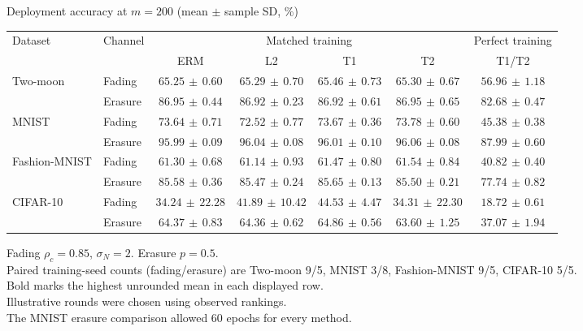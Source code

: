 \documentclass[border=4pt]{standalone}
\begin{document}
\begin{minipage}{7.8in}
\centering
Deployment accuracy at $m=200$ (mean $\pm$ sample SD, \%)\\[4pt]
\begin{tabular*}{\linewidth}{@{\extracolsep{\fill}}llccccc@{}}
\toprule
\multirow{2}{*}{Dataset} & \multirow{2}{*}{Channel} & \multicolumn{4}{c}{Matched training} & Perfect training \\
\cmidrule(lr){3-6}\cmidrule(l){7-7}
 & & ERM & L2 & T1 & T2 & T1/T2 \\
\midrule
\multirow{2}{*}{Two-moon} & Fading & $65.25\,\pm\,0.60$ & $65.29\,\pm\,0.70$ & $\mathbf{65.46}\,\pm\,0.73$ & $65.30\,\pm\,0.67$ & $56.96\,\pm\,1.18$ \\
 & Erasure & $86.95\,\pm\,0.44$ & $86.92\,\pm\,0.23$ & $86.92\,\pm\,0.61$ & $\mathbf{86.95}\,\pm\,0.65$ & $82.68\,\pm\,0.47$ \\
\midrule[0.25pt]
\multirow{2}{*}{MNIST} & Fading & $73.64\,\pm\,0.71$ & $72.52\,\pm\,0.77$ & $73.67\,\pm\,0.36$ & $\mathbf{73.78}\,\pm\,0.60$ & $45.38\,\pm\,0.38$ \\
 & Erasure & $95.99\,\pm\,0.09$ & $96.04\,\pm\,0.08$ & $96.01\,\pm\,0.10$ & $\mathbf{96.06}\,\pm\,0.08$ & $87.99\,\pm\,0.60$ \\
\midrule[0.25pt]
\multirow{2}{*}{Fashion-MNIST} & Fading & $61.30\,\pm\,0.68$ & $61.14\,\pm\,0.93$ & $61.47\,\pm\,0.80$ & $\mathbf{61.54}\,\pm\,0.84$ & $40.82\,\pm\,0.40$ \\
 & Erasure & $85.58\,\pm\,0.36$ & $85.47\,\pm\,0.24$ & $\mathbf{85.65}\,\pm\,0.13$ & $85.50\,\pm\,0.21$ & $77.74\,\pm\,0.82$ \\
\midrule[0.25pt]
\multirow{2}{*}{CIFAR-10} & Fading & $34.24\,\pm\,22.28$ & $41.89\,\pm\,10.42$ & $\mathbf{44.53}\,\pm\,4.47$ & $34.31\,\pm\,22.30$ & $18.72\,\pm\,0.61$ \\
 & Erasure & $64.37\,\pm\,0.83$ & $64.36\,\pm\,0.62$ & $\mathbf{64.86}\,\pm\,0.56$ & $63.60\,\pm\,1.25$ & $37.07\,\pm\,1.94$ \\
\bottomrule
\end{tabular*}
\par\smallskip\raggedright\footnotesize
Fading $\rho_c=0.85$, $\sigma_N=2$. Erasure $p=0.5$.\\
Paired training-seed counts (fading/erasure) are Two-moon 9/5, MNIST 3/8, Fashion-MNIST 9/5, CIFAR-10 5/5.\\
Bold marks the highest unrounded mean in each displayed row.\\
Illustrative rounds were chosen using observed rankings.\\
The MNIST erasure comparison allowed 60 epochs for every method.
\end{minipage}
\end{document}
